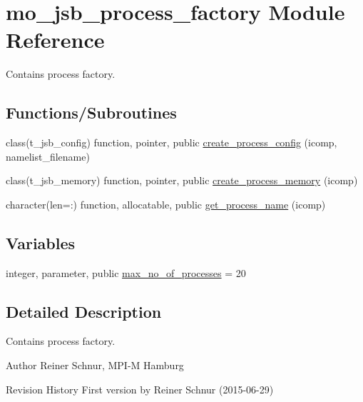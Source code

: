 \hypertarget{namespacemo__jsb__process__factory}{}\section{mo\+\_\+jsb\+\_\+process\+\_\+factory Module Reference}
\label{namespacemo__jsb__process__factory}


Contains process factory.  


\subsection*{Functions/\+Subroutines}
\begin{DoxyCompactItemize}
\item 
class(t\+\_\+jsb\+\_\+config) function, pointer, public \hyperlink{namespacemo__jsb__process__factory_a6f93cf11896531cdf403cd86d13ab571}{create\+\_\+process\+\_\+config} (icomp, namelist\+\_\+filename)
\item 
class(t\+\_\+jsb\+\_\+memory) function, pointer, public \hyperlink{namespacemo__jsb__process__factory_a396024f43415732ae7c3ea7f7b0a053c}{create\+\_\+process\+\_\+memory} (icomp)
\item 
character(len=\+:) function, allocatable, public \hyperlink{namespacemo__jsb__process__factory_a84bab7fc767bd4292e70f82de2511d61}{get\+\_\+process\+\_\+name} (icomp)
\end{DoxyCompactItemize}
\subsection*{Variables}
\begin{DoxyCompactItemize}
\item 
integer, parameter, public \hyperlink{namespacemo__jsb__process__factory_a337f3a29d18cd060186cd10e4b2a878e}{max\+\_\+no\+\_\+of\+\_\+processes} = 20
\end{DoxyCompactItemize}


\subsection{Detailed Description}
Contains process factory. 

\begin{DoxyAuthor}{Author}
Reiner Schnur, M\+P\+I-\/\+M Hamburg
\end{DoxyAuthor}
\begin{DoxyParagraph}{Revision History}
First version by Reiner Schnur (2015-\/06-\/29) 
\end{DoxyParagraph}


